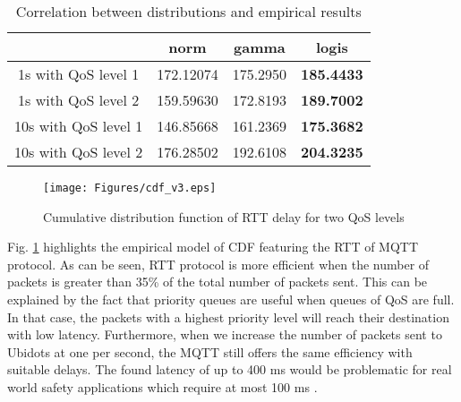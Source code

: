\begin{table} [!htb]
\caption{Correlation between distributions and empirical results}
\centering
  \begin{tabular}{ | c | c | c | c | }
    \hline
	\                    & norm      & gamma    & logis         \\\hline 
	1s  with QoS level 1 & 172.12074 & 175.2950 & \bf{185.4433} \\\hline 
	1s  with QoS level 2 & 159.59630 & 172.8193 & \bf{189.7002} \\\hline 
	10s with QoS level 1 & 146.85668 & 161.2369 & \bf{175.3682} \\\hline 
	10s with QoS level 2 & 176.28502 & 192.6108 & \bf{204.3235} \\\hline
  \end{tabular}
\label{table:correlation}
\end{table}


\begin{figure}[!htb]
\centering
\texttt{[image: Figures/cdf\_v3.eps]}
\caption{Cumulative distribution function of RTT delay for two QoS levels}
\label{fig:cdf.pdf}
\end{figure}

Fig. \ref{fig:cdf.pdf} highlights the empirical model of CDF featuring the RTT of MQTT protocol. As can be seen, RTT protocol is more efficient when the number of packets is greater than 35\% of the total number of packets sent. This can be explained by the fact that priority queues are useful when queues of QoS are full. In that case, the packets with a highest priority level will reach their destination with low latency. Furthermore, when we increase the number of packets sent to Ubidots at one per second, the MQTT still offers the same efficiency with suitable delays. The found latency of up to 400 ms would be problematic for real world safety applications which require at most 100 ms \cite{Chen2017}.


